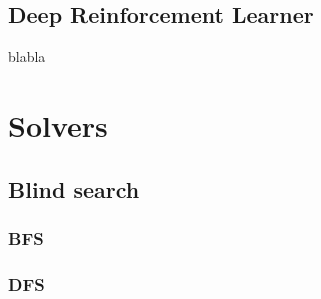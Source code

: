 \subsection{Deep Reinforcement Learner}
\label{DRLSS}

blabla


\section{Solvers}

\subsection{Blind search}
\subsubsection{BFS}
\label{BFSSS}
\subsubsection{DFS}
\label{DFSSS}



